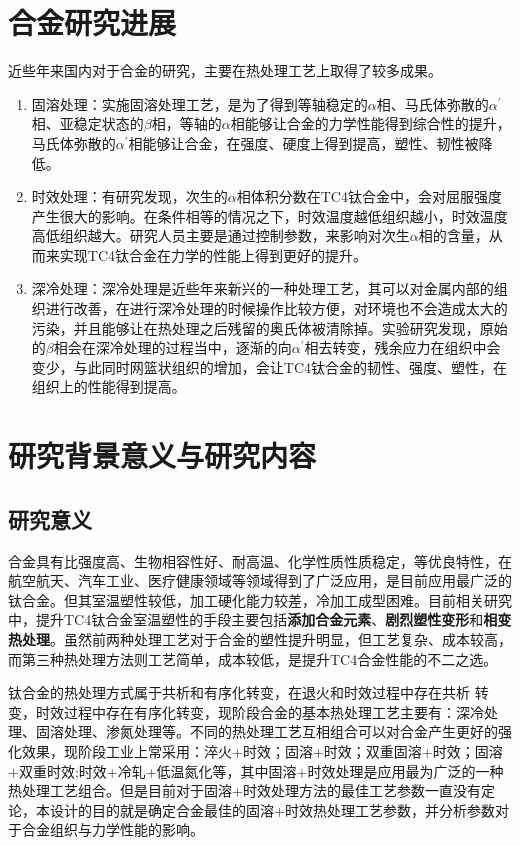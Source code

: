 \section{\ti 合金研究进展}
近些年来国内对于\ti 合金的研究，主要在热处理工艺上取得了较多成果\cite{guokaiTC4taihejinrechuligongyideyanjiuxianzhuangjijinzhan2021}。

\begin{enumerate}
	\item 固溶处理：实施固溶处理工艺，是为了得到等轴稳定的$\alpha$相、马氏体弥散的$ \alpha^{'} $相、亚稳定状态的$\beta$相，等轴的$\alpha$相能够让合金的力学性能得到综合性的提升，马氏体弥散的$ \alpha^{'} $相能够让合金，在强度、硬度上得到提高，塑性、韧性被降低\cite{gurong2002}。
	\item 时效处理：有研究\cite{luyuanyuanShixiaochuliduiTC4taihejinweiguanzuzhihelixuexingnengdeyingxiang2019}发现，次生的$\alpha$相体积分数在TC4钛合金中，会对屈服强度产生很大的影响。在条件相等的情况之下，时效温度越低组织越小，时效温度高低组织越大。研究人员主要是通过控制参数，来影响对次生$\alpha$相的含量，从而来实现TC4钛合金在力学的性能上得到更好的提升。
	\item 深冷处理：深冷处理是近些年来新兴的一种处理工艺，其可以对金属内部的组织进行改善，在进行深冷处理的时候操作比较方便，对环境也不会造成太大的污染，并且能够让在热处理之后残留的奥氏体被清除掉。实验研究发现，原始的$\beta$相会在深冷处理的过程当中，逐渐的向$\alpha^{'}$相去转变，残余应力在组织中会变少，与此同时网篮状组织的增加，会让TC4钛合金的韧性、强度、塑性，在组织上的性能得到提高。
\end{enumerate}

\section{研究背景意义与研究内容}
\subsection{研究意义}
\ti 合金具有比强度高、生物相容性好、耐高温、化学性质性质稳定，等优良特性，在航空航天、汽车工业、医疗健康领域等领域得到了广泛应用，是目前应用最广泛的钛合金。但其室温塑性较低，加工硬化能力较差，冷加工成型困难。目前相关研究中，提升TC4钛合金室温塑性的手段主要包括\textbf{添加合金元素}、\textbf{剧烈塑性变形}和\textbf{相变热处理}。虽然前两种处理工艺对于合金的塑性提升明显，但工艺复杂、成本较高\cite{miao}，而第三种热处理方法则工艺简单，成本较低，是提升TC4合金性能的不二之选。

钛合金的热处理方式属于共析和有序化转变，在退火和时效过程中存在共析 转变，时效过程中存在有序化转变，现阶段\ti 合金的基本热处理工艺主要有：深冷处理、固溶处理、渗氮处理等。不同的热处理工艺互相组合可以对合金产生更好的强化效果，现阶段工业上常采用\cite{zhoukaixiangJiyushenlengchulidenanjiagongcailiaoqiexiaotexingyanjiu2022}：淬火+时效；固溶+时效；双重固溶+时效；固溶+双重时效;时效+冷轧+低温氮化等，其中固溶+时效处理是应用最为广泛的一种热处理工艺组合。但是目前对于固溶+时效处理方法的最佳工艺参数一直没有定论，本设计的目的就是确定\ti 合金最佳的固溶+时效热处理工艺参数，并分析参数对于合金组织与力学性能的影响。

